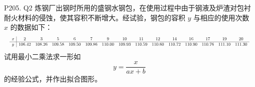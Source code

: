 \documentclass[11pt, a4paper]{ctexart}
\begin{document}
\begin{problem}{P205. Q2}
    炼钢厂出钢时所用的盛钢水钢包，在使用过程中由于钢液及炉渣对包衬耐火材料的侵蚀，使其容积不断增大。经试验，钢包的容积 $y$ 与相应的使用次数 $x$ 的数据如下：
    \[
        \resizebox{\textwidth}{!}{$
        \begin{array}{c|cccccccccccccc}
            x & 2 & 3 & 5 & 6 & 7 & 9 & 10 & 11 & 12 & 14 & 16 & 17 & 19 & 20 \\ \hline
            y & 106.42 & 108.26 & 109.58 & 109.50 & 109.86 & 110.00 & 109.93 & 110.59 & 110.60 & 110.72 & 110.90 & 110.76 & 111.10 & 111.30
        \end{array}
        $}
    \]
    试用最小二乘法求一形如
    \[
        y=\frac{x}{ax+b}
    \]
    的经验公式，并作出拟合图形。
\end{problem}
\end{document}
